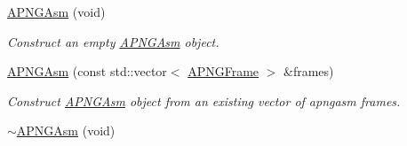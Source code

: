 \begin{DoxyCompactItemize}
\item 
\hypertarget{classapngasm_1_1APNGAsm_a8e20443aff7eab2a51b9140d97168da2}{\hyperlink{classapngasm_1_1APNGAsm_a8e20443aff7eab2a51b9140d97168da2}{A\-P\-N\-G\-Asm} (void)}\label{classapngasm_1_1APNGAsm_a8e20443aff7eab2a51b9140d97168da2}

\begin{DoxyCompactList}\small\item\em Construct an empty \hyperlink{classapngasm_1_1APNGAsm}{A\-P\-N\-G\-Asm} object. \end{DoxyCompactList}\item 
\hyperlink{classapngasm_1_1APNGAsm_a4f8cc13561379ed9fdf7cbe132e1e496}{A\-P\-N\-G\-Asm} (const std\-::vector$<$ \hyperlink{classapngasm_1_1APNGFrame}{A\-P\-N\-G\-Frame} $>$ \&frames)
\begin{DoxyCompactList}\small\item\em Construct \hyperlink{classapngasm_1_1APNGAsm}{A\-P\-N\-G\-Asm} object from an existing vector of apngasm frames. \end{DoxyCompactList}\item 
\hypertarget{classapngasm_1_1APNGAsm_a63670f5cc79de98738c28c303cc74f37}{\hyperlink{classapngasm_1_1APNGAsm_a63670f5cc79de98738c28c303cc74f37}{$\sim$\-A\-P\-N\-G\-Asm} (void)}\label{classapngasm_1_1APNGAsm_a63670f5cc79de98738c28c303cc74f37}


\end{DoxyCompactItemize}
